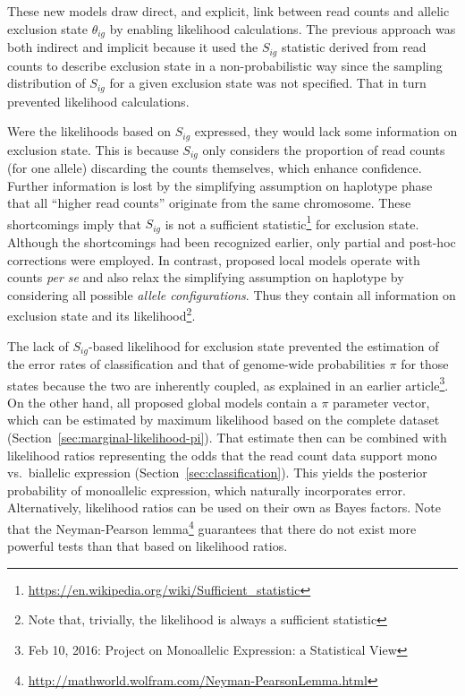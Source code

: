 \documentclass[letterpaper]{article}
\begin{document}
These new models draw direct, and explicit, link between read counts and
allelic exclusion state \(\theta_{ig}\) by enabling likelihood calculations.
The previous approach was both indirect and implicit because it used the
\(S_{ig}\) statistic derived from read counts to describe exclusion state in a
non-probabilistic way since the sampling distribution of \(S_{ig}\) for a
given exclusion state was not specified.  That in turn prevented
likelihood calculations.

Were the likelihoods based on \(S_{ig}\) expressed, they would lack some
information on exclusion state.  This is because \(S_{ig}\) only considers the
proportion of read counts (for one allele) discarding the counts themselves,
which enhance confidence.  Further information is lost by the simplifying
assumption on haplotype phase that all ``higher read counts'' originate from
the same chromosome.  These shortcomings imply that \(S_{ig}\) is not a
sufficient
statistic\footnote{\url{https://en.wikipedia.org/wiki/Sufficient\_statistic}}
for exclusion state.  Although the shortcomings had been recognized earlier,
only partial and post-hoc corrections were employed.  In contrast, proposed
local models operate with counts \emph{per se} and also relax the simplifying
assumption on haplotype by considering all possible \emph{allele
configurations}.  Thus they contain all information on exclusion state and its
likelihood\footnote{Note that, trivially, the likelihood is always a
sufficient statistic}.

The lack of \(S_{ig}\)-based likelihood for exclusion state
prevented the estimation of the error rates of classification and that of
genome-wide probabilities \(\pi\) for those states because the two are
inherently coupled, as explained in an earlier article\footnote{Feb 10, 2016:
Project on Monoallelic Expression: a Statistical View}.  On the other hand,
all proposed global models contain a \(\pi\) parameter vector, which can be
estimated by maximum likelihood based on the complete dataset
(Section~\ref{sec:marginal-likelihood-pi}).  That estimate then can be
combined with likelihood ratios representing the odds that the read count data
support mono vs.~biallelic expression (Section~\ref{sec:classification}). This
yields the posterior probability of monoallelic expression, which naturally
incorporates error.  Alternatively, likelihood ratios can be used on their own
as Bayes factors.  Note that the Neyman-Pearson
lemma\footnote{\url{http://mathworld.wolfram.com/Neyman-PearsonLemma.html}}
guarantees that there do not exist more powerful tests than that based on
likelihood ratios.
\end{document}
